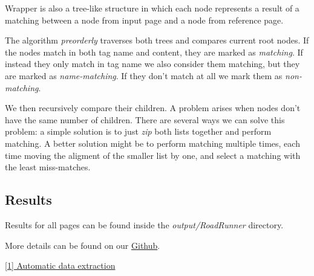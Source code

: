 \documentclass[runningheads]{llncs}
\begin{document}
Wrapper is also a tree-like structure in which each node represents a result of a matching between a node from input page and a node from reference page. 

The algorithm \textit{preorderly} traverses both trees and compares current root nodes. If the nodes match in both tag name and content, they are marked as \textit{matching}. If instead they only match in tag name we also consider them matching, but they are marked as \textit{name-matching}. If they don't match at all we mark them as \textit{non-matching}.

We then recursively compare their children. A problem arises when nodes don't have the same number of children. There are several ways we can solve this problem: a simple solution is to just \textit{zip} both lists together and perform matching. A better solution might be to perform matching multiple times, each time moving the aligment of the smaller list by one, and select a matching with the least miss-matches.

\subsection{Results}

Results for all pages can be found inside the \textit{output/RoadRunner} directory.

More details can be found on our \href{https://github.com/LampDM/structured_data_extraction_methods/tree/master/RoadRunner}{Github}.

\href{https://www.researchgate.net/publication/221213613_RoadRunner_Automatic_data_extraction_from_data-intensive_Web_sites}{[1] Automatic data extraction}
\end{document}
